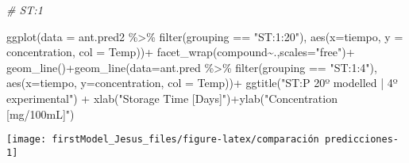 \documentclass[
]{article}
\newenvironment{Shaded}{\begin{snugshade}}{\end{snugshade}}
\newcommand{\AttributeTok}[1]{\textcolor[rgb]{0.77,0.63,0.00}{#1}}
\newcommand{\CommentTok}[1]{\textcolor[rgb]{0.56,0.35,0.01}{\textit{#1}}}
\newcommand{\FunctionTok}[1]{\textcolor[rgb]{0.00,0.00,0.00}{#1}}
\newcommand{\NormalTok}[1]{#1}
\newcommand{\SpecialCharTok}[1]{\textcolor[rgb]{0.00,0.00,0.00}{#1}}
\newcommand{\StringTok}[1]{\textcolor[rgb]{0.31,0.60,0.02}{#1}}
\begin{document}
\begin{Shaded}
\begin{Highlighting}[]
\CommentTok{\# ST:1}

\FunctionTok{ggplot}\NormalTok{(}\AttributeTok{data =}\NormalTok{ ant.pred2 }\SpecialCharTok{\%\textgreater{}\%} \FunctionTok{filter}\NormalTok{(grouping }\SpecialCharTok{==} \StringTok{"ST:1:20"}\NormalTok{), }\FunctionTok{aes}\NormalTok{(}\AttributeTok{x=}\NormalTok{tiempo, }\AttributeTok{y =}\NormalTok{ concentration, }\AttributeTok{col =}\NormalTok{ Temp))}\SpecialCharTok{+}
       \FunctionTok{facet\_wrap}\NormalTok{(compound}\SpecialCharTok{\textasciitilde{}}\NormalTok{.,}\AttributeTok{scales=}\StringTok{"free"}\NormalTok{)}\SpecialCharTok{+}
       \FunctionTok{geom\_line}\NormalTok{()}\SpecialCharTok{+}\FunctionTok{geom\_line}\NormalTok{(}\AttributeTok{data=}\NormalTok{ant.pred }\SpecialCharTok{\%\textgreater{}\%} \FunctionTok{filter}\NormalTok{(grouping }\SpecialCharTok{==} \StringTok{"ST:1:4"}\NormalTok{), }\FunctionTok{aes}\NormalTok{(}\AttributeTok{x=}\NormalTok{tiempo, }\AttributeTok{y=}\NormalTok{concentration, }\AttributeTok{col =}\NormalTok{ Temp))}\SpecialCharTok{+}
  \FunctionTok{ggtitle}\NormalTok{(}\StringTok{"ST:P 20º modelled | 4º experimental"}\NormalTok{) }\SpecialCharTok{+} \FunctionTok{xlab}\NormalTok{(}\StringTok{"Storage Time [Days]"}\NormalTok{)}\SpecialCharTok{+}\FunctionTok{ylab}\NormalTok{(}\StringTok{"Concentration [mg/100mL]"}\NormalTok{)}
\end{Highlighting}
\end{Shaded}

\begin{center}\texttt{[image: firstModel\_Jesus\_files/figure-latex/comparación predicciones-1]} \end{center}
\end{document}
